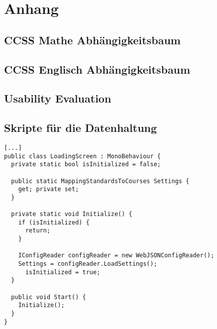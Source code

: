 \chapter*{Anhang}
\section*{CCSS Mathe Abhängigkeitsbaum}
	\label{CCSSMath}
	\begin{center}
		
	\end{center}

\section*{CCSS Englisch Abhängigkeitsbaum}
	\label{CCSSEnglish}
	\begin{center}
		
	\end{center}
	
\section*{Usability Evaluation}
	\label{UEMarcel}
	\begin{center}
		
	\end{center}
\section*{Skripte für die Datenhaltung}
	\label{anhang4}

\begin{scriptsize}
				\lstset{
					float,
					caption=Skript: LoadingScreen.cs, 
					language=[Sharp]C, 
					frame=single,  
					showstringspaces=false, 
					showspaces=false, 
					numbers=left, 
					captionpos=b, 
					belowcaptionskip=4pt,
					basicstyle=\ttfamily
				} 
				\begin{lstlisting}[label=lst:methode34]
[...]
public class LoadingScreen : MonoBehaviour {
  private static bool isInitialized = false;

  public static MappingStandardsToCourses Settings {
    get; private set;
  }

  private static void Initialize() {
    if (isInitialized) {
      return;
    }

    IConfigReader configReader = new WebJSONConfigReader();
    Settings = configReader.LoadSettings();
      isInitialized = true;
  }

  public void Start() {
    Initialize();
  }
}
				\end{lstlisting}
			\end{scriptsize}

